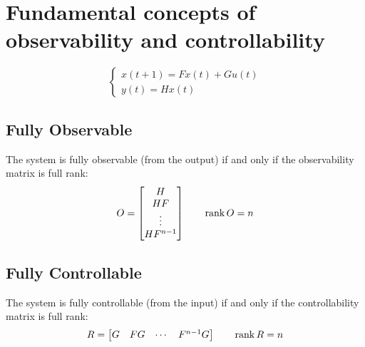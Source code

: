 \newpage
{}

\begin{figure}[H]
    \centering
\end{figure}

\section{Fundamental concepts of observability and controllability}

\[
    \begin{cases}
        x(t+1) = Fx(t) + Gu(t) \\
        y(t) = Hx(t)
    \end{cases}
\]

\subsection{Fully Observable}
The system is fully observable (from the output) if and only if the observability matrix is full rank:
\[
    O = \begin{bmatrix}
        H \\
        HF \\
        \vdots \\
        HF^{n-1}
    \end{bmatrix}
    \qquad
    \operatorname{rank} O = n
\]

\subsection{Fully Controllable}
The system is fully controllable (from the input) if and only if the controllability matrix is full rank:
\[
    R = \begin{bmatrix}
        G & FG & \cdots & F^{n-1}G
    \end{bmatrix}
    \qquad
    \operatorname{rank} R = n
\]

